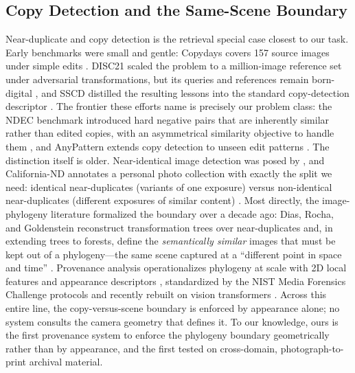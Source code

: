 \documentclass[letterpaper]{article} %
\begin{document}
\subsection{Copy Detection and the Same-Scene Boundary}
Near-duplicate and copy detection is the retrieval special case closest to our
task. Early benchmarks were small and gentle: Copydays covers 157 source
images under simple edits \cite{douze2009copydays}. DISC21 scaled the problem
to a million-image reference set under adversarial transformations, but its
queries and references remain born-digital \cite{douze2021disc}, and SSCD
distilled the resulting lessons into the standard copy-detection descriptor
\cite{pizzi2022sscd}. The frontier these efforts name is precisely our problem
class: the NDEC benchmark introduced hard negative pairs that are inherently
similar rather than edited copies, with an asymmetrical similarity objective
to handle them \cite{wang2023ndec}, and AnyPattern extends copy detection to
unseen edit patterns \cite{wang2026anypattern}. The distinction itself is
older. Near-identical image detection was posed by \citet{chum2007scalable},
and California-ND annotates a personal photo collection with exactly the split
we need: identical near-duplicates (variants of one exposure) versus
non-identical near-duplicates (different exposures of similar content)
\cite{jindaapiraksa2013california}. Most directly, the image-phylogeny
literature formalized the boundary over a decade ago: Dias, Rocha, and
Goldenstein reconstruct transformation trees over near-duplicates
\cite{dias2012phylogeny} and, in extending trees to forests, define the
\emph{semantically similar} images that must be kept out of a phylogeny---the
same scene captured at a ``different point in space and time''
\cite{dias2013forests}. Provenance analysis operationalizes phylogeny at scale
with 2D local features and appearance descriptors \cite{moreira2018provenance},
standardized by the NIST Media Forensics Challenge protocols \cite{guan2019mfc}
and recently rebuilt on vision transformers
\cite{zhang2024provenancevit,lai2025provenance}. Across this entire line, the
copy-versus-scene boundary is enforced by appearance alone; no system consults
the camera geometry that defines it. To our knowledge, ours is the first
provenance system to enforce the phylogeny boundary geometrically rather than
by appearance, and the first tested on cross-domain, photograph-to-print
archival material.
\end{document}
